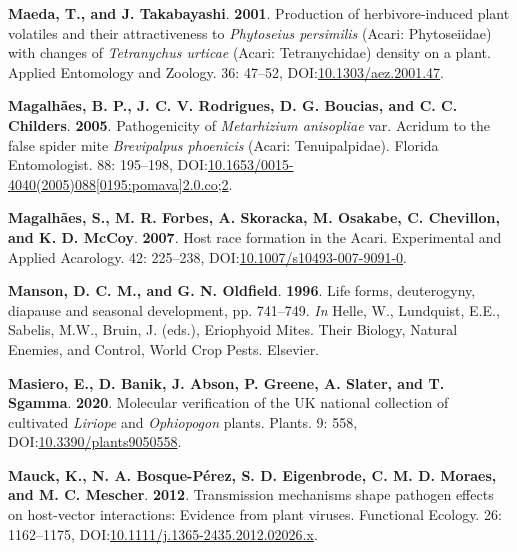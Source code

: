 \documentclass[12pt,final,CPage]{ufthesis}
\newlength{\cslhangindent}
\newenvironment{CSLReferences}[2] %
{%
	\setlength{\parindent}{0pt}
	\ifodd #1 \everypar{\setlength{\hangindent}{\cslhangindent}}\ignorespaces\fi
	\ifnum #2 > 0
	\setlength{\parskip}{#2\baselineskip}
	\fi
}%
{}
\begin{document}
{\begin{CSLReferences}{1}{0}
  \leavevmode{}%
  \textbf{Maeda, T., and J. Takabayashi}. \textbf{2001}. Production of herbivore-induced plant volatiles and their attractiveness to {\emph{Phytoseius persimilis}} {({Acari}: {Phytoseiidae})} with changes of {\emph{Tetranychus urticae}} {({Acari}: Tetranychidae)} density on a plant. Applied Entomology and Zoology. 36: 47--52, DOI:\href{https://doi.org/10.1303/aez.2001.47}{10.1303/aez.2001.47}.

  \leavevmode{}%
  \textbf{Magalhães, B. P., J. C. V. Rodrigues, D. G. Boucias, and C. C. Childers}. \textbf{2005}. Pathogenicity of {\emph{Metarhizium anisopliae}} var. Acridum to the false spider mite {\emph{Brevipalpus phoenicis}} ({Acari}: {Tenuipalpidae}). Florida Entomologist. 88: 195--198, DOI:\href{https://doi.org/10.1653/0015-4040(2005)088\%5B0195:pomava\%5D2.0.co;2}{10.1653/0015-4040(2005)088{[}0195:pomava{]}2.0.co;2}.

  \leavevmode{}%
  \textbf{Magalhães, S., M. R. Forbes, A. Skoracka, M. Osakabe, C. Chevillon, and K. D. McCoy}. \textbf{2007}. Host race formation in the {Acari}. Experimental and Applied Acarology. 42: 225--238, DOI:\href{https://doi.org/10.1007/s10493-007-9091-0}{10.1007/s10493-007-9091-0}.

  \leavevmode{}%
  \textbf{Manson, D. C. M., and G. N. Oldfield}. \textbf{1996}. Life forms, deuterogyny, diapause and seasonal development, pp. 741--749. \emph{In} Helle, W., Lundquist, E.E., Sabelis, M.W., Bruin, J. (eds.), Eriophyoid Mites. Their Biology, Natural Enemies, and Control, World Crop Pests. Elsevier.

  \leavevmode{}%
  \textbf{Masiero, E., D. Banik, J. Abson, P. Greene, A. Slater, and T. Sgamma}. \textbf{2020}. Molecular verification of the {UK} national collection of cultivated {\emph{Liriope}} and {\emph{Ophiopogon}} plants. Plants. 9: 558, DOI:\href{https://doi.org/10.3390/plants9050558}{10.3390/plants9050558}.

  \leavevmode{}%
  \textbf{Mauck, K., N. A. Bosque-Pérez, S. D. Eigenbrode, C. M. D. Moraes, and M. C. Mescher}. \textbf{2012}. Transmission mechanisms shape pathogen effects on host-vector interactions: Evidence from plant viruses. Functional Ecology. 26: 1162--1175, DOI:\href{https://doi.org/10.1111/j.1365-2435.2012.02026.x}{10.1111/j.1365-2435.2012.02026.x}.


\end{CSLReferences}}
\end{document}
